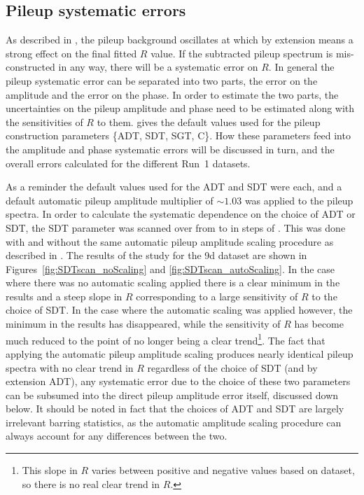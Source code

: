 \subsection{Pileup systematic errors}
\label{sub:pileuperror}

As described in , the pileup background oscillates at \wa which by extension means a strong effect on the final fitted $R$ value. If the subtracted pileup spectrum is mis-constructed in any way, there will be a systematic error on $R$. In general the pileup systematic error can be separated into two parts, the error on the amplitude and the error on the phase. In order to estimate the two parts, the uncertainties on the pileup amplitude and phase need to be estimated along with the sensitivities of $R$ to them.  gives the default values used for the pileup construction parameters \{ADT, SDT, SGT, C\}. How these parameters feed into the amplitude and phase systematic errors will be discussed in turn, and the overall errors calculated for the different Run~1 datasets.


As a reminder the default values used for the ADT and SDT were  each, and a default automatic pileup amplitude multiplier of $\sim1.03$ was applied to the pileup spectra. In order to calculate the systematic dependence on the choice of ADT or SDT, the SDT parameter was scanned over from  to  in steps of . This was done with and without the same automatic pileup amplitude scaling procedure as described in . The results of the study for the 9d dataset are shown in Figures~\ref{fig:SDTscan_noScaling} and \ref{fig:SDTscan_autoScaling}. In the case where there was no automatic scaling applied there is a clear minimum in the \chisq results and a steep slope in $R$ corresponding to a large sensitivity of $R$ to the choice of SDT. In the case where the automatic scaling was applied however, the minimum in the \chisq results has disappeared, while the sensitivity of $R$ has become much reduced to the point of no longer being a clear trend\footnote{This slope in $R$ varies between positive and negative values based on dataset, so there is no real clear trend in $R$.}. The fact that applying the automatic pileup amplitude scaling produces nearly identical pileup spectra with no clear trend in $R$ regardless of the choice of SDT (and by extension ADT), any systematic error due to the choice of these two parameters can be subsumed into the direct pileup amplitude error itself, discussed down below. It should be noted in fact that the choices of ADT and SDT are largely irrelevant barring statistics, as the automatic amplitude scaling procedure can always account for any differences between the two. 


